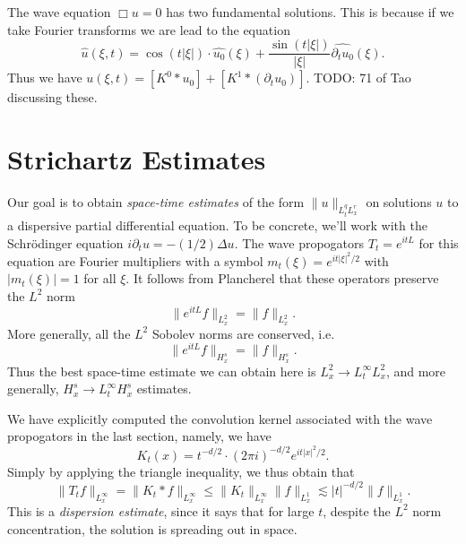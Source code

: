 \begin{example}
	The wave equation $\Box u = 0$ has two fundamental solutions. This is because if we take Fourier transforms we are lead to the equation
	\[ \widehat{u}(\xi,t) = \cos(t |\xi|) \cdot \widehat{u_0}(\xi) + \frac{\sin(t |\xi|)}{|\xi|} \widehat{\partial_t u_0}(\xi). \]
	Thus we have $u(\xi,t) = [K^0 * u_0] + [K^1 * (\partial_t u_0)]$. TODO: 71 of Tao discussing these.
\end{example}







\section{Strichartz Estimates}

Our goal is to obtain \emph{space-time estimates} of the form $\| u \|_{L^q_t L^r_x}$ on solutions $u$ to a dispersive partial differential equation. To be concrete, we'll work with the Schr\"{o}dinger equation $i \partial_t u = - (1/2) \Delta u$. The wave propogators $T_t = e^{i t L}$ for this equation are Fourier multipliers with a symbol $m_t(\xi) = e^{it |\xi|^2 / 2}$ with $|m_t(\xi)| = 1$ for all $\xi$. It follows from Plancherel that these operators preserve the $L^2$ norm
%
\[ \| e^{itL} f \|_{L^2_x} = \| f \|_{L^2_x}. \]
%
More generally, all the $L^2$ Sobolev norms are conserved, i.e.
%
\[ \| e^{itL} f \|_{H^s_x} = \| f \|_{H^s_x}. \]
%
Thus the best space-time estimate we can obtain here is $L^2_x \to L^\infty_t L^2_x$, and more generally, $H^s_x \to L^\infty_t H^s_x$ estimates.

We have explicitly computed the convolution kernel associated with the wave propogators in the last section, namely, we have
%
\[ K_t(x) = t^{-d/2} \cdot (2 \pi i)^{-d/2} e^{i t |x|^2 / 2}. \]
%
Simply by applying the triangle inequality, we thus obtain that
%
\[ \| T_t f \|_{L^\infty_x} = \| K_t * f \|_{L^\infty_x} \leq \| K_t \|_{L^\infty_x} \| f \|_{L^1_x} \lesssim |t|^{-d/2} \| f \|_{L^1_x}. \]
%
This is a \emph{dispersion estimate}, since it says that for large $t$, despite the $L^2$ norm concentration, the solution is spreading out in space.


